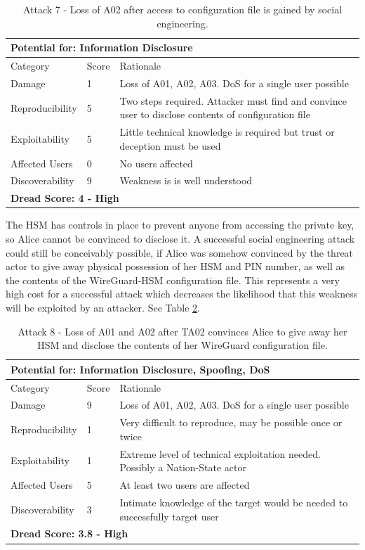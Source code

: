 \documentclass [11pt, proquest] {uwthesis}[2020/02/24]
\begin{document}
\begin{table}[H]
\begin{tabular}{|m{3cm}|m{1cm}|p{27em} |}
\multicolumn{3}{l}{Potential for: Information Disclosure} \\
\hline
Category & Score & Rationale \\
\hline
Damage          & 1     & Loss of A01, A02, A03. DoS for a single user possible  \\
\hline
Reproducibility & 5     & Two steps required. Attacker must find and convince user to disclose contents of configuration file    \\
\hline
Exploitability & 5      & Little technical knowledge is required but trust or deception must be used   \\
\hline
Affected Users  & 0     & No users affected  \\
\hline
Discoverability & 9     & Weakness is is well understood  \\
\hline
\multicolumn{3}{l}{\textbf{Dread Score: 4 - High}} 
\end{tabular}
\caption{Attack 7 - Loss of A02 after access to configuration file is gained by social engineering.}
\label{hsm_attack7_social}
\end{table}

The HSM has controls in place to prevent anyone from accessing the private key, so Alice cannot be convinced to disclose it.
A successful social engineering attack could still be conceivably possible, if Alice was somehow convinced by the threat actor to give away physical possession of her HSM and PIN number, as well as the contents of the WireGuard-HSM configuration file. This represents a very high cost for a successful attack which decreases the likelihood that this weakness will be exploited by an attacker. 
See Table \ref{hsm_attack8_social}.


\begin{table}[H]
\begin{tabular}{|m{3cm}|m{1cm}|p{27em} |}
\multicolumn{3}{l}{Potential for: Information Disclosure, Spoofing, DoS}                   \\
\hline
Category & Score & Rationale \\
\hline
Damage          & 9     & Loss of A01, A02, A03. DoS for a single user possible            \\
\hline
Reproducibility & 1     & Very difficult to reproduce, may be possible once or twice  \\
\hline
Exploitability & 1      & Extreme level of technical exploitation needed. Possibly a Nation-State actor  \\
\hline
Affected Users  & 5     & At least two users are affected                      \\
\hline
Discoverability & 3     & Intimate knowledge of the target would be needed to successfully target user \\
\hline
\multicolumn{3}{l}{\textbf{Dread Score: 3.8 - High}} 
\end{tabular}
\caption{Attack 8 - Loss of A01 and A02 after TA02 convinces Alice to give away her HSM and disclose the contents of her WireGuard configuration file.}
\label{hsm_attack8_social}
\end{table}
\end{document}

